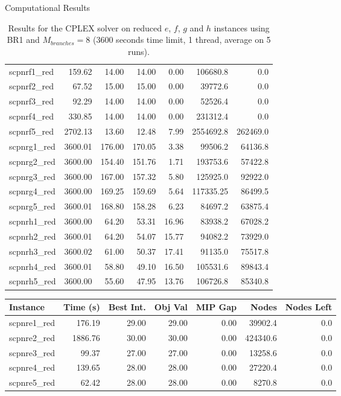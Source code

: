 \documentclass[a4paper,12pt]{mydeitesi_eng}
\begin{document}
\begin{chapter}{Computational Results}
\begin{table}[h]
\begin{center}
\begin{tabular}{l|r|r|r|r|r|r}
scpnrf1\_red & 159.62 & 14.00 & 14.00 & 0.00 & 106680.8 & 0.0\\ 
scpnrf2\_red & 67.52 & 15.00 & 15.00 & 0.00 & 39772.6 & 0.0\\ 
scpnrf3\_red & 92.29 & 14.00 & 14.00 & 0.00 & 52526.4 & 0.0\\ 
scpnrf4\_red & 330.85 & 14.00 & 14.00 & 0.00 & 231312.4 & 0.0\\ 
scpnrf5\_red & 2702.13 & 13.60 & 12.48 & 7.99 & 2554692.8 & 262469.0\\
\hline
 
scpnrg1\_red & 3600.01 & 176.00 & 170.05 & 3.38 & 99506.2 & 64136.8\\ 
scpnrg2\_red & 3600.00 & 154.40 & 151.76 & 1.71 & 193753.6 & 57422.8\\ 
scpnrg3\_red & 3600.00 & 167.00 & 157.32 & 5.80 & 125925.0 & 92922.0\\ 
scpnrg4\_red & 3600.00 & 169.25 & 159.69 & 5.64 & 117335.25 & 86499.5\\ 
scpnrg5\_red & 3600.01 & 168.80 & 158.28 & 6.23 & 84697.2 & 63875.4\\
\hline
 
scpnrh1\_red & 3600.00 & 64.20 & 53.31 & 16.96 & 83938.2 & 67028.2\\ 
scpnrh2\_red & 3600.01 & 64.20 & 54.07 & 15.77 & 94082.2 & 73929.0\\ 
scpnrh3\_red & 3600.02 & 61.00 & 50.37 & 17.41 & 91135.0 & 75517.8\\ 
scpnrh4\_red & 3600.01 & 58.80 & 49.10 & 16.50 & 105531.6 & 89843.4\\ 
scpnrh5\_red & 3600.00 & 55.60 & 47.95 & 13.76 & 106726.8 & 85340.8\\ 
\end{tabular}
\end{center}
\caption{Results for the CPLEX solver on reduced $e$, $f$, $g$ and $h$ instances using BR1 and $M_{branches} = 8$ (3600 seconds time limit, 1 thread, average on 5  runs).}
\label{tab:ResultBR1_M8}
\end{table}


\begin{table}[h]
\begin{center}
\begin{tabular}{l|r|r|r|r|r|r}
\textbf{Instance} & \textbf{Time (s)} & \textbf{Best Int.} & \textbf{Obj Val} & \textbf{MIP Gap} & \textbf{Nodes} & \textbf{Nodes Left}\\
\hline
scpnre1\_red & 176.19 & 29.00 & 29.00 & 0.00 & 39902.4 & 0.0\\ 
scpnre2\_red & 1886.76 & 30.00 & 30.00 & 0.00 & 424340.6 & 0.0\\ 
scpnre3\_red & 99.37 & 27.00 & 27.00 & 0.00 & 13258.6 & 0.0\\ 
scpnre4\_red & 139.65 & 28.00 & 28.00 & 0.00 & 27220.4 & 0.0\\ 
scpnre5\_red & 62.42 & 28.00 & 28.00 & 0.00 & 8270.8 & 0.0\\ 
\hline


\end{tabular}
\end{center}
\end{table}
\end{chapter}
\end{document}
